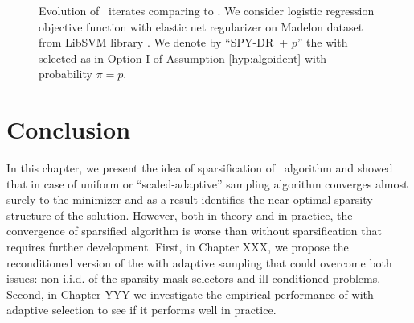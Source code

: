 {\begin{figure}[H]
\begin{center}
 \hfill
{}
\end{center}
\caption{Evolution of \maskalgo~iterates comparing to \dave. We consider logistic regression objective function with elastic net regularizer on Madelon dataset from LibSVM library \cite{chang2011libsvm}. We denote by ``SPY-DR~+ $p$'' the \maskalgo with selected as in Option I of Assumption \ref{hyp:algoident} with probability $\pi = p$.}
\label{fig:spydr}
\end{figure}

\section{Conclusion}
In this chapter, we present the idea of sparsification of \dave~algorithm and showed that in case of uniform or ``scaled-adaptive'' sampling algorithm converges almost surely to the minimizer and as a result identifies the near-optimal sparsity structure of the solution. However, both in theory and in practice, the convergence of sparsified algorithm is worse than without sparsification that requires further development. First, in Chapter XXX, we propose the reconditioned version of the \salgo with adaptive sampling that could overcome both issues: non i.i.d. of the sparsity mask selectors and ill-conditioned problems. Second, in Chapter YYY we investigate the empirical performance of \salgo with adaptive selection to see if it performs well in practice.
}